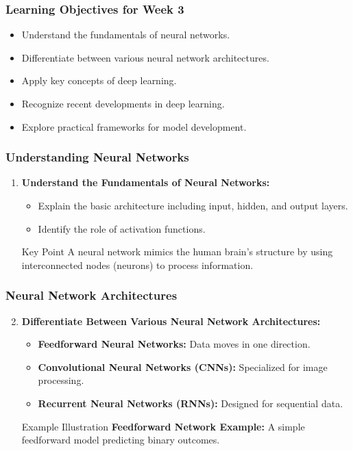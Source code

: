 \documentclass[aspectratio=169]{beamer}
\begin{document}
\begin{frame}
    \frametitle{Learning Objectives for Week 3}
    \begin{itemize}
        \item Understand the fundamentals of neural networks.
        \item Differentiate between various neural network architectures.
        \item Apply key concepts of deep learning.
        \item Recognize recent developments in deep learning.
        \item Explore practical frameworks for model development.
    \end{itemize}
\end{frame}

\begin{frame}[fragile]
    \frametitle{Understanding Neural Networks}
    \begin{enumerate}
        \item \textbf{Understand the Fundamentals of Neural Networks:}
        \begin{itemize}
            \item Explain the basic architecture including input, hidden, and output layers.
            \item Identify the role of activation functions.
        \end{itemize}
        
        \begin{block}{Key Point}
            A neural network mimics the human brain's structure by using interconnected nodes (neurons) to process information.
        \end{block}
    \end{enumerate}
\end{frame}

\begin{frame}
    \frametitle{Neural Network Architectures}
    \begin{enumerate}
        \setcounter{enumi}{1}
        \item \textbf{Differentiate Between Various Neural Network Architectures:}
        \begin{itemize}
            \item \textbf{Feedforward Neural Networks:} Data moves in one direction.
            \item \textbf{Convolutional Neural Networks (CNNs):} Specialized for image processing.
            \item \textbf{Recurrent Neural Networks (RNNs):} Designed for sequential data.
        \end{itemize}

        \begin{block}{Example Illustration}
            \textbf{Feedforward Network Example:} A simple feedforward model predicting binary outcomes.
        \end{block}
    \end{enumerate}
\end{frame}
\end{document}
